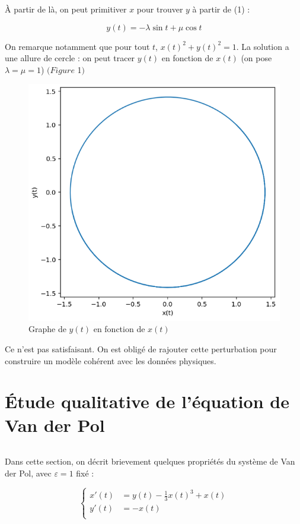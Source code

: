 \documentclass{article}
\begin{document}
À partir de là, on peut primitiver $x$ pour trouver $y$ à partir de (1) :

\[ y(t) = -\lambda \sin t + \mu \cos t\]

On remarque notamment que pour tout $t$,  $x(t)^2 + y(t)^2 = 1$. La solution a une allure de cercle : on peut tracer $y(t)$ en fonction de $x(t)$ (on pose $\lambda = \mu = 1$)  $(Figure$ 1$)$ 

\begin{figure}[H]
\centering
\includegraphics[scale=0.5]{../images/plot_circ.png}
\caption{Graphe de $y(t)$ en fonction de $x(t)$}
\end{figure}

Ce n'est pas satisfaisant. On est obligé de rajouter cette perturbation pour construire un modèle cohérent avec les données physiques.

\section{Étude qualitative de l’équation de Van der Pol}

\[\]

Dans cette section, on décrit brievement quelques propriétés du système de Van der Pol, avec $\varepsilon = 1$ fixé :

\begin{equation}
    \left\{
    \begin{aligned}
        x'(t) &= y(t) - \frac{1}{3} x(t)^3 + x(t) \\   
        y'(t) &= -x(t)\\
   \end{aligned}
   \right.
\end{equation}
\end{document}
